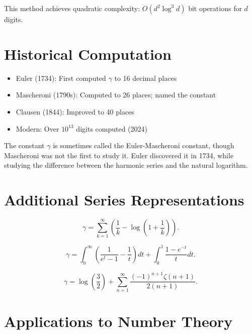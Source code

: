This method achieves quadratic complexity: $O(d^2 \log^3 d)$ bit operations for $d$ digits.

\section{Historical Computation}

\begin{itemize}
    \item Euler (1734): First computed $\gamma$ to 16 decimal places
    \item Mascheroni (1790s): Computed to 26 places; named the constant
    \item Clausen (1844): Improved to 40 places
    \item Modern: Over $10^{13}$ digits computed (2024)
\end{itemize}

\begin{historical}
The constant $\gamma$ is sometimes called the Euler-Mascheroni constant, though Mascheroni was not the first to study it. Euler discovered it in 1734, while studying the difference between the harmonic series and the natural logarithm.
\end{historical}

\section{Additional Series Representations}

\begin{theorem}
\[
\gamma = \sum_{k=1}^\infty \left(\frac{1}{k} - \log\left(1 + \frac{1}{k}\right)\right).
\]
\end{theorem}

\begin{theorem}
\[
\gamma = \int_0^\infty \left(\frac{1}{e^t - 1} - \frac{1}{t}\right) dt + \int_0^1 \frac{1 - e^{-t}}{t} dt.
\]
\end{theorem}

\begin{theorem}
\[
\gamma = \log\left(\frac{3}{2}\right) + \sum_{n=1}^\infty \frac{(-1)^{n+1} \zeta(n+1)}{2(n+1)}.
\]
\end{theorem}

\section{Applications to Number Theory}

